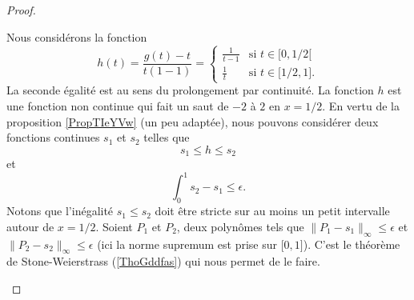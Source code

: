 \begin{proof}
\begin{subproof}
        Nous considérons la fonction
        \begin{equation}
            h(t)=\frac{ g(t)-t }{ t(1-1) }=\begin{cases}
                \frac{1}{ t-1 }    &   \text{si } t\in \mathopen[ 0 , 1/2 [\\
                \frac{1}{ t }    &    \text{si } t\in \mathopen[ 1/2 , 1 \mathclose].
            \end{cases}
        \end{equation}
        La seconde égalité est au sens du prolongement par continuité. La fonction \( h\) est une fonction non continue qui fait un saut de \( -2\) à \( 2\) en \( x=1/2\). En vertu de la proposition \ref{PropTIeYVw} (un peu adaptée), nous pouvons considérer deux fonctions continues \( s_1\) et \( s_2\) telles que
        \begin{equation}
            s_1\leq h\leq s_2
        \end{equation}
        et
        \begin{equation}
            \int_{0}^1s_2-s_1\leq \epsilon.
        \end{equation}
        Notons que l'inégalité \( s_1\leq s_2\) doit être stricte sur au moins un petit intervalle autour de \( x=1/2\). Soient \( P_1\) et \( P_2\), deux polynômes tels que \( \| P_1-s_1 \|_{\infty}\leq \epsilon\) et \( \| P_2-s_2 \|_{\infty}\leq \epsilon\) (ici la norme supremum est prise sur \( \mathopen[ 0 , 1 \mathclose]\)). C'est le théorème de Stone-Weierstrass (\ref{ThoGddfas}) qui nous permet de le faire.


\end{subproof}
\end{proof}
